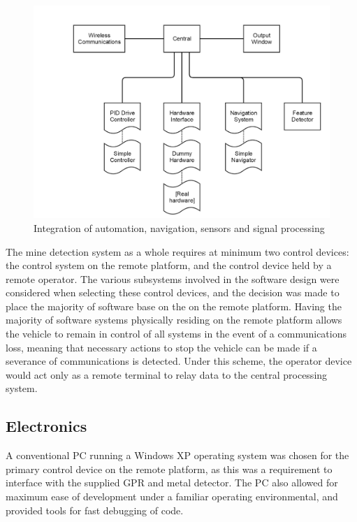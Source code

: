 \documentclass[main.tex]{subfiles}
\begin{document}
\begin{figure}[ht]
\includegraphics[width=\textwidth]{3-ConceptDesign/fyp_structure.png}
\centering
\caption{Integration of automation, navigation, sensors and signal processing} 
\end{figure}

The mine detection system as a whole requires at minimum two control devices: the control system on the remote platform, and the control device held by a remote operator. The various subsystems involved in the software design were considered when selecting these control devices, and the decision was made to place the majority of software base on the on the remote platform. Having the majority of software systems physically residing on the remote platform allows the vehicle to remain in control of all systems in the event of a communications loss, meaning that necessary actions to stop the vehicle can be made if a severance of communications is detected. Under this scheme, the operator device would act only as a remote terminal to relay data to the central processing system.

\subsection{Electronics}
A conventional PC running a Windows XP operating system was chosen for the primary control device on the remote platform, as this was a requirement to interface with the supplied GPR and metal detector. The PC also allowed for maximum ease of development under a familiar operating environmental, and provided tools for fast debugging of code.
\end{document}
